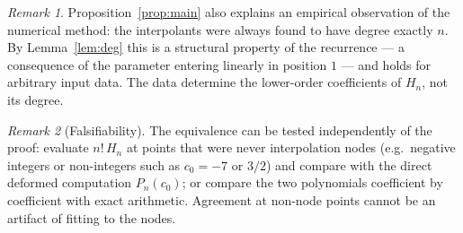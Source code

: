 \documentclass[11pt]{article}
\theoremstyle{remark}
\newtheorem{remark}{Remark}
\begin{document}
\begin{remark}
Proposition~\ref{prop:main} also explains an empirical observation of the
numerical method: the interpolants were always found to have degree exactly
$n$. By Lemma~\ref{lem:deg} this is a structural property of the recurrence
--- a consequence of the parameter entering linearly in position $1$ ---
and holds for arbitrary input data. The data determine the lower-order
coefficients of $H_n$, not its degree.
\end{remark}

\begin{remark}[Falsifiability]
The equivalence can be tested independently of the proof: evaluate
$n!\, H_n$ at points that were never interpolation nodes (e.g.\ negative
integers or non-integers such as $c_0 = -7$ or $3/2$) and compare with the
direct deformed computation $P_n(c_0)$; or compare the two polynomials
coefficient by coefficient with exact arithmetic. Agreement at non-node
points cannot be an artifact of fitting to the nodes.
\end{remark}
\end{document}

